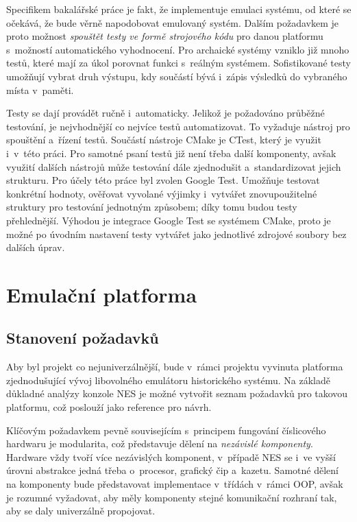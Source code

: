 Specifikem bakalářské práce je fakt, že implementuje emulaci systému, od které se očekává, že bude věrně napodobovat emulovaný systém. Dalším požadavkem je proto možnost \emph{spouštět testy ve formě strojového kódu} pro danou platformu s~možností automatického vyhodnocení. Pro archaické systémy vzniklo již mnoho testů, které mají za úkol porovnat funkci s~reálným systémem. Sofistikované testy umožňují vybrat druh výstupu, kdy součástí bývá i~zápis výsledků do vybraného místa v~paměti.

Testy se dají provádět ručně i~automaticky. Jelikož je požadováno průběžné testování, je nejvhodnější co nejvíce testů automatizovat. To vyžaduje nástroj pro spouštění a~řízení testů. Součástí nástroje CMake je CTest, který je využit i~v~této práci. Pro samotné psaní testů již není třeba další komponenty, avšak využití dalších nástrojů může testování dále zjednodušit a~standardizovat jejich strukturu. Pro účely této práce byl zvolen Google Test. Umožňuje testovat konkrétní hodnoty, ověřovat vyvolané výjimky i~vytvářet znovupoužitelné struktury pro testování jednotným způsobem; díky tomu budou testy přehlednější. Výhodou je integrace Google Test se systémem CMake, proto je možné po úvodním nastavení testy vytvářet jako jednotlivé zdrojové soubory bez dalších úprav.

\section{Emulační platforma}
\label{sec:navrh-platforma}
\subsection{Stanovení požadavků}
\label{sec:navrh-pozadavky}

Aby byl projekt co nejuniverzálnější, bude v~rámci projektu vyvinuta platforma zjednodušující vývoj libovolného emulátoru historického systému. Na základě důkladné analýzy konzole NES je možné vytvořit seznam požadavků pro takovou platformu, což poslouží jako reference pro návrh.

Klíčovým požadavkem pevně souvisejícím s~principem fungování číslicového hardwaru je modularita, což představuje dělení na \emph{nezávislé komponenty}. Hardware vždy tvoří více nezávislých komponent, v~případě NES se i~ve vyšší úrovni abstrakce jedná třeba o~procesor, grafický čip a~kazetu. Samotné dělení na komponenty bude představovat implementace v~třídách v~rámci OOP, avšak je rozumné vyžadovat, aby měly komponenty stejné komunikační rozhraní tak, aby se daly univerzálně propojovat.

